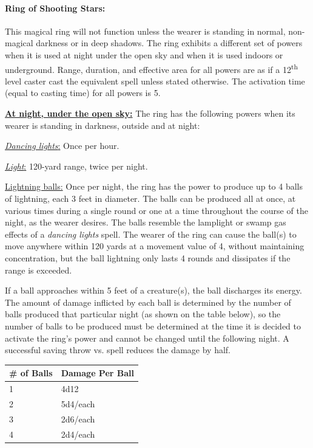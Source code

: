 \begin{multicols}{2}
\paragraph{Ring of Shooting Stars:}  This magical ring will not function unless the wearer is standing in normal, non-magical darkness or in deep shadows.  The ring exhibits a different set of powers when it is used at night under the open sky and when it is used indoors or underground.  Range, duration, and effective area for all powers are as if a 12\textsuperscript{th} level caster cast the equivalent spell unless stated otherwise. The activation time (equal to casting time) for all powers is 5.

\textbf{\underline{At night, under the open sky:}} The ring has the following powers when its wearer is standing in darkness, outside and at night:

\underline{\textit{Dancing lights}:} Once per hour.

\underline{\textit{Light}:} 120-yard range, twice per night.

\underline{Lightning balls:} Once per night, the ring has the power to produce up to 4 balls of lightning, each 3 feet in diameter.  The balls can be produced all at once, at various times during a single round or one at a time throughout the course of the night, as the wearer desires.  The balls resemble the lamplight or swamp gas effects of a \textit{dancing lights} spell.  The wearer of the ring can cause the ball(s) to move anywhere within 120 yards at a movement value of 4, without maintaining concentration, but the ball lightning only lasts 4 rounds and dissipates if the range is exceeded.  

If a ball approaches within 5 feet of a creature(s), the ball discharges its energy.  The amount of damage inflicted by each ball is determined by the number of balls produced that particular night (as shown on the table below), so the number of balls to be produced must be determined at the time it is decided to activate the ring's power and cannot be changed until the following night.  A successful saving throw vs. spell reduces the damage by half.

\noindent
\begin{tabular}{|p{}|p{}|}
\hline
\# of Balls	& Damage Per Ball \\
\hline\hline
\rowcolor[gray]{.9}1	& 4d12 \\
2	& 5d4/each \\
\rowcolor[gray]{.9}3	& 2d6/each \\
4	& 2d4/each \\
\hline
\end{tabular}


\end{multicols}

